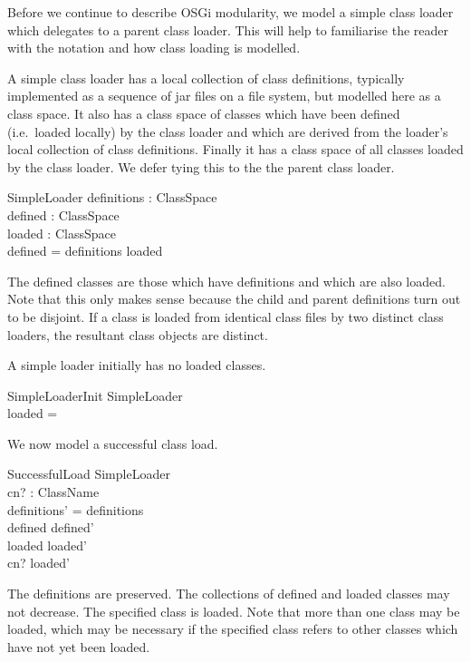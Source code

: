 \documentclass[a4paper,9pt]{article}
\begin{document}
Before we continue to describe OSGi modularity, we model a simple class loader
which delegates to a parent class loader.
This will help to familiarise the reader with the notation and how class
loading is modelled.

A simple class loader has a local collection of class
definitions, typically implemented as a sequence of jar files on a file
system, but modelled here as a class space.
It also has a class space of classes which have been defined
(i.e.\ loaded locally) by the class loader and which are derived from
the loader's local collection of class definitions.
Finally it has a class space of all classes loaded by the class loader. 
We defer tying this to the the parent class loader.
\begin{schema}{SimpleLoader}
  definitions : ClassSpace \\
  defined : ClassSpace \\
  loaded : ClassSpace \\
\where
  defined = definitions \cap loaded \\
\end{schema}
The defined classes are those which have definitions and which are also loaded.
Note that this only makes sense because the child and parent definitions turn
out to be disjoint. If a class is loaded from identical class files by two
distinct class loaders, the resultant class objects are distinct. 

A simple loader initially has no loaded classes.
\begin{schema}{SimpleLoaderInit}
  SimpleLoader \\
\where
  loaded = \emptyset
\end{schema}

We now model a successful class load.
\begin{schema}{SuccessfulLoad}
  \Delta SimpleLoader \\
  cn? : ClassName \\
\where
  definitions' = definitions \\
  defined \subseteq defined' \\
  loaded \subseteq loaded' \\
  cn? \in \dom loaded' \\
\end{schema}
The definitions are preserved.
The collections of defined and loaded classes may not decrease.
The specified class is loaded.
Note that more than one class may be loaded, which
may be necessary if the specified class refers to other classes
which have not yet been loaded.
\end{document}
